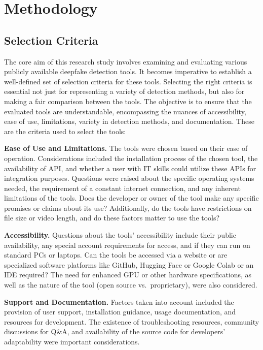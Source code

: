 
\chapter{Methodology}\label{chapter:methodology}

\section{Selection Criteria}
The core aim of this research study involves examining and evaluating
various publicly available deepfake detection tools. It becomes imperative
to establish a well-defined set of selection criteria for these tools.
Selecting the right criteria is essential not just for representing a variety
of detection methods, but also for making a fair comparison between the tools.
The objective is to ensure that the evaluated tools are understandable,
encompassing the nuances of accessibility, ease of use, limitations, variety
in detection methods, and documentation. These are the criteria used to select the tools:

\textbf{Ease of Use and Limitations.} The tools were chosen based on their ease of
operation. Considerations included the installation process of the chosen tool,
the availability of \ac{API}, and whether a user with IT skills could utilize
these APIs for integration purposes. Questions were raised about the specific
operating systems needed, the requirement of a constant internet connection,
and any inherent limitations of the tools. Does the developer or owner of the
tool make any specific promises or claims about its use? Additionally, do the
tools have restrictions on file size or video length, and do these factors
matter to use the tools?

\textbf{Accessibility.} Questions about the tools' accessibility include their
public availability, any special account requirements for access, and if they can
run on standard PCs or laptops. Can the tools be accessed via a website or are specialized
software platforms like GitHub, Hugging Face or Google Colab or an \ac{IDE} required?
The need for enhanced \ac{GPU} or other hardware specifications, as well as the nature
of the tool (open source vs.\ proprietary), were also considered.

\textbf{Support and Documentation.} Factors taken into account included the
provision of user support, installation guidance, usage documentation, and
resources for development. The existence of troubleshooting resources,
community discussions for Q\&A, and availability of the source code for
developers' adaptability were important considerations.

